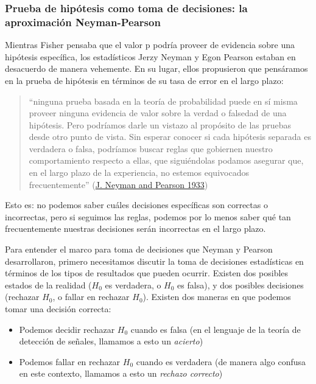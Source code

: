 \documentclass[
  12pt,
]{book}
\providecommand{\tightlist}{%
  \setlength{\itemsep}{0pt}\setlength{\parskip}{0pt}}
\begin{document}
\hypertarget{prueba-de-hipuxf3tesis-como-toma-de-decisiones-la-aproximaciuxf3n-neyman-pearson}{%
\subsubsection{Prueba de hipótesis como toma de decisiones: la aproximación Neyman-Pearson}\label{prueba-de-hipuxf3tesis-como-toma-de-decisiones-la-aproximaciuxf3n-neyman-pearson}}

Mientras Fisher pensaba que el valor p podría proveer de evidencia sobre una hipótesis específica, los estadísticos Jerzy Neyman y Egon Pearson estaban en desacuerdo de manera vehemente. En su lugar, ellos propusieron que pensáramos en la prueba de hipótesis en términos de su tasa de error en el largo plazo:

\begin{quote}
``ninguna prueba basada en la teoría de probabilidad puede en sí misma proveer ninguna evidencia de valor sobre la verdad o falsedad de una hipótesis. Pero podríamos darle un vistazo al propósito de las pruebas desde otro punto de vista. Sin esperar conocer si cada hipótesis separada es verdadera o falsa, podríamos buscar reglas que gobiernen nuestro comportamiento respecto a ellas, que siguiéndolas podamos asegurar que, en el largo plazo de la experiencia, no estemos equivocados frecuentemente'' (\protect\hyperlink{ref-Neyman289}{J. Neyman and Pearson 1933})
\end{quote}

Esto es: no podemos saber cuáles decisiones específicas son correctas o incorrectas, pero si seguimos las reglas, podemos por lo menos saber qué tan frecuentemente nuestras decisiones serán incorrectas en el largo plazo.

Para entender el marco para toma de decisiones que Neyman y Pearson desarrollaron, primero necesitamos discutir la toma de decisiones estadísticas en términos de los tipos de resultados que pueden ocurrir. Existen dos posibles estados de la realidad (\(H_0\) es verdadera, o \(H_0\) es falsa), y dos posibles decisiones (rechazar \(H_0\), o fallar en rechazar \(H_0\)). Existen dos maneras en que podemos tomar una decisión correcta:

\begin{itemize}
\tightlist
\item
  Podemos decidir rechazar \(H_0\) cuando es falsa (en el lenguaje de la teoría de detección de señales, llamamos a esto un \emph{acierto})
\item
  Podemos fallar en rechazar \(H_0\) cuando es verdadera (de manera algo confusa en este contexto, llamamos a esto un \emph{rechazo correcto})
\end{itemize}
\end{document}
